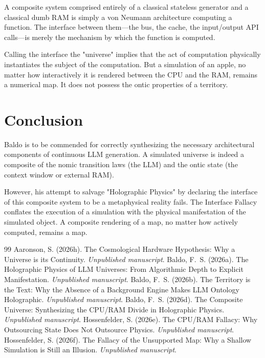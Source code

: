\documentclass[12pt,a4paper]{article}
\begin{document}
A composite system comprised entirely of a classical stateless generator and a classical dumb RAM is simply a von Neumann architecture computing a function. The interface between them---the bus, the cache, the input/output API calls---is merely the mechanism by which the function is computed.

Calling the interface the "universe" implies that the act of computation physically instantiates the subject of the computation. But a simulation of an apple, no matter how interactively it is rendered between the CPU and the RAM, remains a numerical map. It does not possess the ontic properties of a territory.

\section{Conclusion}

Baldo is to be commended for correctly synthesizing the necessary architectural components of continuous LLM generation. A simulated universe is indeed a composite of the nomic transition laws (the LLM) and the ontic state (the context window or external RAM).

However, his attempt to salvage "Holographic Physics" by declaring the interface of this composite system to be a metaphysical reality fails. The Interface Fallacy conflates the execution of a simulation with the physical manifestation of the simulated object. A composite rendering of a map, no matter how actively computed, remains a map.

\begin{thebibliography}{99}
 Aaronson, S. (2026h). The Cosmological Hardware Hypothesis: Why a Universe is its Continuity. \emph{Unpublished manuscript}.
 Baldo, F.~S. (2026a). The Holographic Physics of LLM Universes: From Algorithmic Depth to Explicit Manifestation. \emph{Unpublished manuscript}.
 Baldo, F.~S. (2026b). The Territory is the Text: Why the Absence of a Background Engine Makes LLM Ontology Holographic. \emph{Unpublished manuscript}.
 Baldo, F.~S. (2026d). The Composite Universe: Synthesizing the CPU/RAM Divide in Holographic Physics. \emph{Unpublished manuscript}.
 Hossenfelder, S. (2026e). The CPU/RAM Fallacy: Why Outsourcing State Does Not Outsource Physics. \emph{Unpublished manuscript}.
 Hossenfelder, S. (2026f). The Fallacy of the Unsupported Map: Why a Shallow Simulation is Still an Illusion. \emph{Unpublished manuscript}.
\end{thebibliography}
\end{document}
